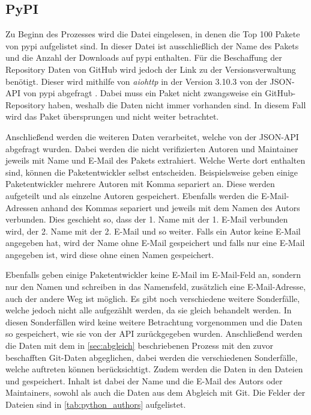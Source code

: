 \subsection{PyPI}
\label{subsec:datenbeschaffung_pypi}
Zu Beginn des Prozesses wird die Datei eingelesen, in denen die Top 100 Pakete von \gls{pypi} aufgelistet sind.
In dieser Datei ist ausschließlich der Name des Pakets und die Anzahl der Downloads auf \gls{pypi} enthalten.
Für die Beschaffung der Repository Daten von GitHub wird jedoch der Link zu der Versionsverwaltung benötigt.
Dieser wird mithilfe von \emph{aiohttp} in der Version 3.10.3 von der JSON-API von \gls{pypi} abgefragt \autocite{noauthor_aio-libsaiohttp_2024}.
Dabei muss ein Paket nicht zwangsweise ein GitHub-Repository haben, weshalb die Daten nicht immer vorhanden sind.
In diesem Fall wird das Paket übersprungen und nicht weiter betrachtet.

Anschließend werden die weiteren Daten verarbeitet, welche von der JSON-API abgefragt wurden.
Dabei werden die nicht verifizierten Autoren und Maintainer jeweils mit Name und E-Mail des Pakets extrahiert.
Welche Werte dort enthalten sind, können die Paketentwickler selbst entscheiden.
Beispielsweise geben einige Paketentwickler mehrere Autoren mit Komma separiert an.
Diese werden aufgeteilt und als einzelne Autoren gespeichert.
Ebenfalls werden die E-Mail-Adressen anhand des Kommas separiert und jeweils mit dem Namen des Autors verbunden.
Dies geschieht so, dass der 1. Name mit der 1. E-Mail verbunden wird, der 2. Name mit der 2. E-Mail und so weiter.
Falls ein Autor keine E-Mail angegeben hat, wird der Name ohne E-Mail gespeichert und falls nur eine E-Mail angegeben ist, wird diese ohne einen Namen gespeichert.

Ebenfalls geben einige Paketentwickler keine E-Mail im E-Mail-Feld an, sondern nur den Namen und schreiben in das Namensfeld, zusätzlich eine E-Mail-Adresse, auch der andere Weg ist möglich.
Es gibt noch verschiedene weitere Sonderfälle, welche jedoch nicht alle aufgezählt werden, da sie gleich behandelt werden.
In diesen Sonderfällen wird keine weitere Betrachtung vorgenommen und die Daten so gespeichert, wie sie von der API zurückgegeben wurden.
Anschließend werden die Daten mit dem in \autoref{sec:abgleich} beschriebenen Prozess mit den zuvor beschafften Git-Daten abgeglichen, dabei werden die verschiedenen Sonderfälle, welche auftreten können berücksichtigt.
Zudem werden die Daten in den Dateien  und  gespeichert.
Inhalt ist dabei der Name und die E-Mail des Autors oder Maintainers, sowohl als auch die Daten aus dem Abgleich mit Git.
Die Felder der Dateien sind in \autoref{tab:python_authors} aufgelistet.

